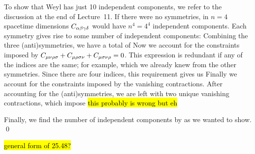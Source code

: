 \documentclass[11pt]{article}
\begin{document}
{	To show that Weyl has just 10 independent components, we refer to the discussion at the end of Lecture~11.  If there were no symmetries, in $n = 4$ spacetime dimensions $C_{\alpha \beta \gamma \delta}$ would have $n^4 = 4^4$ independent components.  Each symmetry gives rise to some number of independent components:
	Combining the three (anti)symmetries, we have a total of
	Now we account for the constraints imposed by $C_{\mu \nu \rho \sigma} + C_{\mu \rho \sigma \nu} + C_{\mu \sigma \nu \rho} = 0$.  This expression is redundant if any of the indices are the same; for example,
	which we already knew from the other symmetries.  Since there are four indices, this requirement gives us
	Finally we account for the constraints imposed by the vanishing contractions.  After accounting for the (anti)symmetries, we are left with two unique vanishing contractions, which impose
	\hl{this probably is wrong but eh}
	
	Finally, we find the number of independent components by
	as we wanted to show. \qed
	
	\hl{general form of 25.48?}
}






\clearpage






\clearpage
{}
\end{document}
